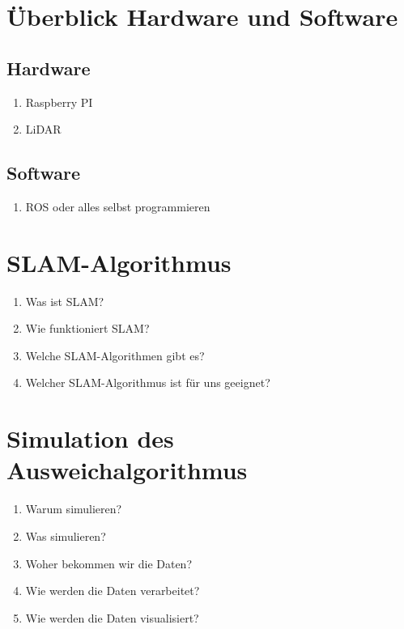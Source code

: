 \documentclass[12pt]{article}
\begin{document}
\section{Überblick Hardware und Software}

\subsection{Hardware}
\begin{enumerate}
    \item Raspberry PI\\
    \item LiDAR\\
\end{enumerate}

\subsection{Software}
\begin{enumerate}
    \item ROS oder alles selbst programmieren\\
\end{enumerate}

\section{SLAM-Algorithmus}

\begin{enumerate}
    \item Was ist SLAM?\\
    \item Wie funktioniert SLAM?\\
    \item Welche SLAM-Algorithmen gibt es?\\
    \item Welcher SLAM-Algorithmus ist für uns geeignet?\\

\end{enumerate}
\section{Simulation des Ausweichalgorithmus}

\begin{enumerate}
    \item Warum simulieren?\\
    \item Was simulieren?\\
    \item Woher bekommen wir die Daten?\\
    \item Wie werden die Daten verarbeitet?\\
    \item Wie werden die Daten visualisiert?\\
\end{enumerate}
\end{document}
